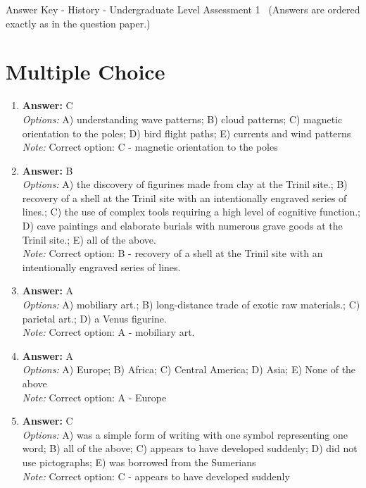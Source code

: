 \documentclass[12pt]{article}
\begin{document}
\begin{center}
Answer Key - History - Undergraduate Level Assessment 1 \
\small (Answers are ordered exactly as in the question paper.)
\end{center}

\section*{Multiple Choice}
\begin{enumerate}[label=\arabic*.]
\item \textbf{Answer:} C
\\ \textit{Options:} A) understanding wave patterns; B) cloud patterns; C) magnetic orientation to the poles; D) bird flight paths; E) currents and wind patterns
\\ \textit{Note:} Correct option: C - magnetic orientation to the poles
\item \textbf{Answer:} B
\\ \textit{Options:} A) the discovery of figurines made from clay at the Trinil site.; B) recovery of a shell at the Trinil site with an intentionally engraved series of lines.; C) the use of complex tools requiring a high level of cognitive function.; D) cave paintings and elaborate burials with numerous grave goods at the Trinil site.; E) all of the above.
\\ \textit{Note:} Correct option: B - recovery of a shell at the Trinil site with an intentionally engraved series of lines.
\item \textbf{Answer:} A
\\ \textit{Options:} A) mobiliary art.; B) long-distance trade of exotic raw materials.; C) parietal art.; D) a Venus figurine.
\\ \textit{Note:} Correct option: A - mobiliary art.
\item \textbf{Answer:} A
\\ \textit{Options:} A) Europe; B) Africa; C) Central America; D) Asia; E) None of the above
\\ \textit{Note:} Correct option: A - Europe
\item \textbf{Answer:} C
\\ \textit{Options:} A) was a simple form of writing with one symbol representing one word; B) all of the above; C) appears to have developed suddenly; D) did not use pictographs; E) was borrowed from the Sumerians
\\ \textit{Note:} Correct option: C - appears to have developed suddenly
\end{enumerate}
\end{document}
